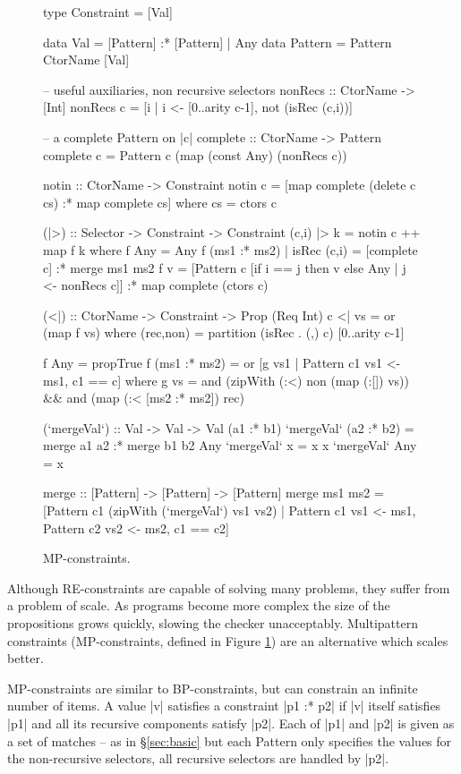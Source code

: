 \documentclass[preprint]{sigplanconf}
\newcommand{\C}[1]{\textsf{#1}}
\begin{document}
\begin{figure}
\begin{code}
type Constraint = [Val]

data Val      =  [Pattern] :* [Pattern]
              |  Any
data Pattern  =  Pattern CtorName [Val]

-- useful auxiliaries, non recursive selectors
nonRecs :: CtorName -> [Int]
nonRecs c = [i | i <- [0..arity c-1], not (isRec (c,i))]

-- a complete Pattern on |c|
complete :: CtorName -> Pattern
complete c = Pattern c (map (const Any) (nonRecs c))

notin :: CtorName -> Constraint
notin c = [map complete (delete c cs) :* map complete cs]
    where cs = ctors c

(|>) :: Selector -> Constraint -> Constraint
(c,i) |> k = notin c ++ map f k
    where
    f Any = Any
    f (ms1 :* ms2) | isRec (c,i) = [complete c] :* merge ms1 ms2
    f v =  [Pattern c [if i == j then v else Any | j <- nonRecs c]]
           :* map complete (ctors c)

(<|) :: CtorName -> Constraint -> Prop (Req Int)
c <| vs = or (map f vs)
    where
    (rec,non) = partition (isRec . (,) c) [0..arity c-1]

    f Any = propTrue
    f (ms1 :* ms2) = or [g vs1 | Pattern c1 vs1 <- ms1, c1 == c]
        where g vs =  and (zipWith (:<) non (map (:[]) vs)) &&
                      and (map (:< [ms2 :* ms2]) rec)

(`mergeVal`) :: Val -> Val -> Val
(a1 :* b1) `mergeVal` (a2 :* b2)  = merge a1 a2 :* merge b1 b2
Any        `mergeVal` x           = x
x          `mergeVal` Any         = x

merge :: [Pattern] -> [Pattern] -> [Pattern]
merge  ms1 ms2 = [Pattern c1 (zipWith (`mergeVal`) vs1 vs2) |
       Pattern c1 vs1 <- ms1, Pattern c2 vs2 <- ms2, c1 == c2]
\end{code}
\caption{MP-constraints.}
\label{fig:enumeration}
\end{figure}

Although RE-constraints are capable of solving many problems, they suffer from a problem of scale. As programs become more complex the size of the propositions grows quickly, slowing the checker unacceptably. Multipattern constraints (MP-constraints, defined in Figure \ref{fig:enumeration}) are an alternative which scales better.

MP-constraints are similar to BP-constraints, but can constrain an infinite number of items. A value |v| satisfies a constraint |p1 :* p2| if |v| itself satisfies |p1| and all its recursive components satisfy |p2|. Each of |p1| and |p2| is given as a set of matches -- as in \S\ref{sec:basic} but each \C{Pattern} only specifies the values for the non-recursive selectors, all recursive selectors are handled by |p2|.
\end{document}
